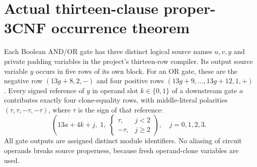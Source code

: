 \documentclass[11pt]{article}
\begin{document}
\section{Actual thirteen-clause proper-3CNF occurrence theorem}
Each Boolean AND/OR gate has three distinct logical source
names $u,v,y$ and private padding variables in the
project's thirteen-row compiler.  Its output source variable
$y$ occurs in five rows of its own block. For an OR gate,
these are the negative row $(13g+8,2,-)$ and four
positive rows $(13g+9,\ldots,13g+12,1,+)$. Every
signed reference of $y$ in operand slot $k\in\{0,1\}$
of a downstream gate $a$ contributes exactly four
clone-equality rows, with middle-literal polarities
$(\tau,\tau,-\tau,-\tau)$, where
$\tau$ is the sign of that reference:
\[
 (13a+4k+j,\;1,\;
     \begin{cases}\tau,&j<2\\-\tau,&j\ge2\end{cases}),
 \quad j=0,1,2,3.                                      \tag{10}
\]
All gate outputs are assigned distinct module identifiers.
No aliasing of circuit operands breaks source properness,
because fresh operand-clone variables are used.
\end{document}
